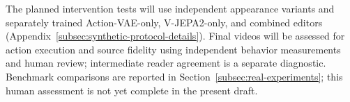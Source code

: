 The planned intervention tests will use independent appearance variants
and separately trained Action-VAE-only, V-JEPA2-only, and combined editors
(Appendix~\ref{subsec:synthetic-protocol-details}). Final videos will be
assessed for action execution and source fidelity using independent
behavior measurements and human review; intermediate reader agreement
is a separate diagnostic. Benchmark comparisons are reported in
Section~\ref{subsec:real-experiments}; this human assessment is not yet
complete in the present draft.

